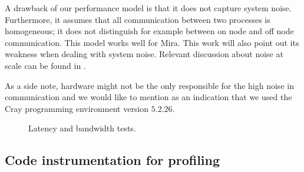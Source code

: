 \documentclass{sig-alternate}
\begin{document}
A drawback of our performance model is that it does not capture system
noise. Furthermore, it assumes that all communication between two processes is
homogeneous; it does not distinguish for example between on node and off node
communication. This model works well for Mira. This work will also point out its
weakness when dealing with system noise. Relevant discussion about noise at 
scale can be found in \cite{Hoefler:2010}.

As a side note, hardware might not be the only responsible for the high noise in
communication and we would like to mention as an indication that we used the Cray 
programming environment version $5.2.26$. 


\begin{figure}
  \centering
  \caption{Latency and bandwidth tests.}
  \label{fig:pingpong}
\end{figure}

\subsection{Code instrumentation for profiling}
\label{sec:timers}
 
\end{document}
